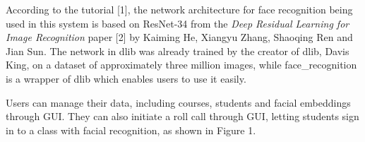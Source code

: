 \documentclass[14pt]{report}
\begin{document}
According to the tutorial [1], the network architecture for face recognition being used in this system 
is based on ResNet-34 from the \textit {Deep Residual Learning for Image Recognition} paper [2] by Kaiming He, 
Xiangyu Zhang, Shaoqing Ren and Jian Sun. The network in dlib was already trained by the creator of dlib,
Davis King, on a dataset of approximately three million images, while face\_recognition is a wrapper of
dlib which enables users to use it easily.
\newline

Users can manage their data, including courses, students and facial embeddings through GUI\@. They can also 
initiate a roll call through GUI, letting students sign in to a class with facial recognition, as shown in
Figure 1.
\newline
\end{document}

